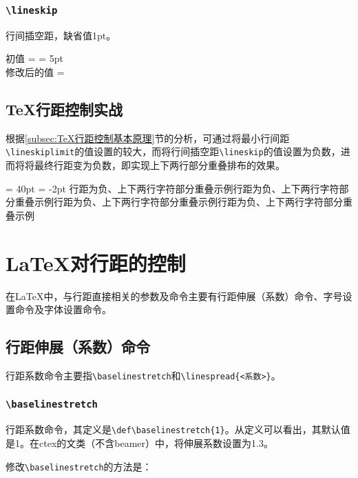 \documentclass{ctexart}
\newcommand{\cmd}[1]{\texttt{\textbackslash #1}}
\begin{document}
	\subsubsection{\cmd{lineskip}}
	行间插空距，缺省值1pt。
	
	\begin{LTXexample}[width = .35\linewidth, caption = \cmd{lineskip}初值及修改示例]
		初值 = \printlength{\lineskip}
		\lineskip = 5pt\\
		修改后的值 = \printlength{\lineskip}
	\end{LTXexample}
	
	\subsection{\TeX 行距控制实战}
	根据\ref{subsec:TeX行距控制基本原理}节的分析，可通过将最小行间距\cmd{lineskiplimit}的值设置的较大，而将行间插空距\cmd{lineskip}的值设置为负数，进而将将最终行距变为负数，即实现上下两行部分重叠排布的效果。
	
	
	\begin{LTXexample}[width = .35\linewidth, caption = 行距为负示例、上下两行字符部分重叠]
		\lineskiplimit = 40pt
		\lineskip = -2pt
		行距为负、上下两行字符部分重叠示例行距为负、上下两行字符部分重叠示例行距为负、上下两行字符部分重叠示例行距为负、上下两行字符部分重叠示例
	\end{LTXexample}
	
	\section{\LaTeX 对行距的控制}
	
	在\LaTeX 中，与行距直接相关的参数及命令主要有行距伸展（系数）命令、字号设置命令及字体设置命令。
	
	\subsection{行距伸展（系数）命令}
	行距系数命令主要指\cmd{baselinestretch}和\cmd{linespread\{<系数>\}}。
	
	\subsubsection{\cmd{baselinestretch}}
	行距系数命令，其定义是\verb|\def\baselinestretch{1}|。从定义可以看出，其默认值是1。在ctex的文类（不含beamer）中，将伸展系数设置为1.3。
	
	修改\cmd{baselinestretch}的方法是：
	
\end{document}
